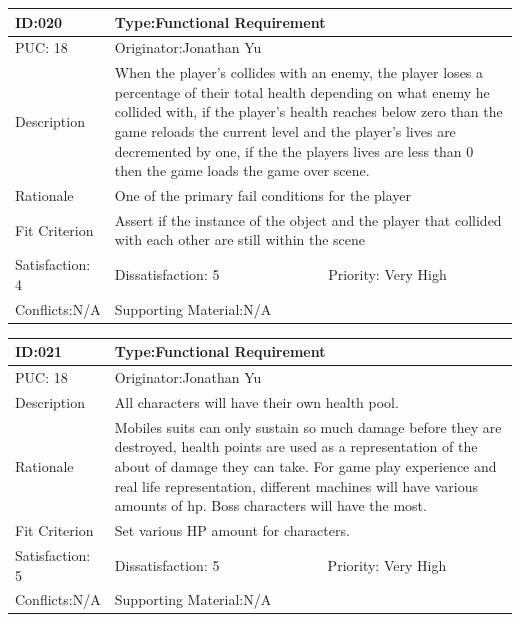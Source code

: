 \documentclass{article}
\begin{document}
	\begin{table}[H]
		\begin{tabular}{|l|l|l|}
			\hline
			ID:020 & \multicolumn{2}{l|}{Type:Functional Requirement} \\ \hline
			PUC: 18 & \multicolumn{2}{l|}{Originator:Jonathan Yu} \\ \hline
			Description & \multicolumn{2}{m{0.85\textwidth}|}{When the player’s collides with an enemy, the player loses a percentage of their total health depending on what enemy he collided with, if the player’s health reaches below zero than the game reloads the current level and the player’s lives are decremented by one, if the the players lives are less than 0 then the game loads the game over scene.} \\ \hline
			Rationale & \multicolumn{2}{m{0.85\textwidth}|}{One of the primary fail conditions for the player} \\ \hline
			Fit Criterion & \multicolumn{2}{m{0.85\textwidth}|}{Assert if the instance of the object and the player that collided with each other are still within the scene} \\ \hline
			Satisfaction: 4 & Dissatisfaction: 5 & Priority: Very High \\ \hline
			Conflicts:N/A & \multicolumn{2}{l|}{Supporting Material:N/A} \\ \hline
		\end{tabular}
	\end{table}




	\begin{table}[H]
		\begin{tabular}{|l|l|l|}
			\hline
			ID:021 & \multicolumn{2}{l|}{Type:Functional Requirement} \\ \hline
			PUC: 18& \multicolumn{2}{l|}{Originator:Jonathan Yu} \\ \hline
			Description & \multicolumn{2}{m{0.85\textwidth}|}{All characters will have their own health pool.}\\\hline
			Rationale & \multicolumn{2}{m{0.85\textwidth}|}{Mobiles suits can only sustain so much damage before they are destroyed, health points are used as a representation of the about of damage  they can take. For game play experience and real life representation, different machines will have various amounts of hp. Boss characters will have the most.} \\ \hline
			Fit Criterion & \multicolumn{2}{m{0.85\textwidth}|}{Set various HP amount for characters.} \\ \hline
			Satisfaction: 5 & Dissatisfaction: 5 & Priority: Very High \\ \hline
			Conflicts:N/A & \multicolumn{2}{l|}{Supporting Material:N/A} \\ \hline
		\end{tabular}
	\end{table}
\end{document}
